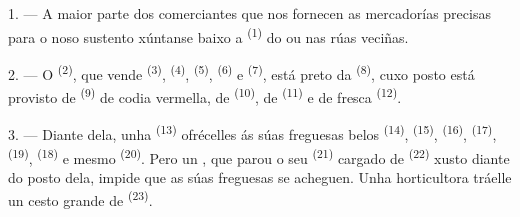 %
%

\VUsaut{4.0mm}
\VUsaut{3.0mm}

\VUsaut{3.0mm}

1. --- A maior parte dos comerciantes que nos fornecen as mercadorías precisas para o noso
sustento xúntanse baixo a  \textsuperscript{(1)} do
 ou nas rúas veciñas.

2. --- O  \textsuperscript{(2)}, que vende 
\textsuperscript{(3)},  \textsuperscript{(4)}, 
\textsuperscript{(5)},  \textsuperscript{(6)} e 
\textsuperscript{(7)}, está preto da 
\textsuperscript{(8)}, cuxo posto está provisto de 
\textsuperscript{(9)} de codia vermella, de  \textsuperscript{(10)},
de  \textsuperscript{(11)} e de
 fresca \textsuperscript{(12)}.

3. --- Diante dela, unha  \textsuperscript{(13)} ofrécelles ás
súas freguesas belos  \textsuperscript{(14)},
 \textsuperscript{(15)}, 
\textsuperscript{(16)},  \textsuperscript{(17)},
 \textsuperscript{(19)},  \textsuperscript{(18)} e
mesmo  \textsuperscript{(20)}. Pero un , que
parou o seu  \textsuperscript{(21)} cargado de
 \textsuperscript{(22)} xusto diante do posto dela, impide que as
súas freguesas se acheguen. Unha horticultora tráelle un cesto grande de 
\textsuperscript{(23)}.

